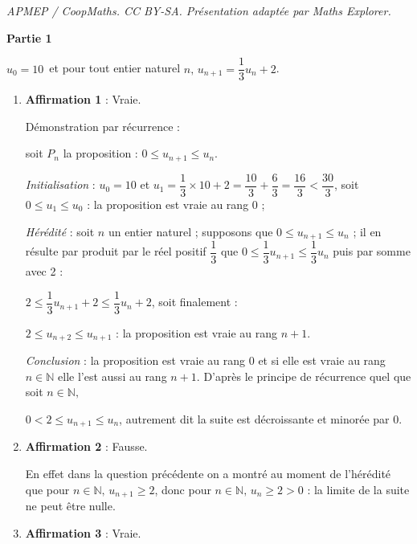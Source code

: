 \documentclass[10pt]{article}
\providecommand{\N}{\mathbb{N}}
\begin{document}
\noindent\textit{APMEP / CoopMaths. CC BY-SA. Présentation adaptée par Maths Explorer.}\par\medskip
\medskip









\textbf{Partie 1}

\medskip



\begin{center}$u_0 = 10$\, et pour tout entier naturel $n,\,u_{n+1} = \dfrac13 u_n + 2$.\end{center}

\medskip

\begin{enumerate}
\item \textbf{Affirmation 1} : Vraie. 

Démonstration par récurrence :

soit $P_n$ la proposition : \og $0 \leqslant u_{n+1} \leqslant u_n $\fg.

\emph{Initialisation} : $u_0 = 10$ et $u_1 = \dfrac13 \times 10 + 2 = \dfrac{10}{3} + \dfrac63 = \dfrac{16}{3} < \dfrac{30}{3}$, soit $0\leqslant u_1 \leqslant u_0$ : la proposition est vraie au rang $0$ ;

\emph{Hérédité} : soit $n$ un entier naturel ; supposons que  $0\leqslant u_{n+1} \leqslant u_n$ ; il en résulte par produit par le réel positif $\dfrac13$ que \quad  $0 \leqslant \dfrac13 u_{n+1} \leqslant \dfrac13 u_n$ puis par somme avec 2 :

$2 \leqslant \dfrac13 u_{n+1} + 2 \leqslant \dfrac13 u_n + 2$, soit finalement :

$2 \leqslant u_{n+2} \leqslant u_{n+1}$ : la proposition est vraie au rang $n + 1$.

\emph{Conclusion} : la proposition est vraie au rang 0 et si elle est vraie au rang $n \in \N$ elle l'est aussi au rang $n + 1$. D'après le principe de récurrence quel que soit $n \in \N,\,$

$ 0 < 2 \leqslant u_{n+1} \leqslant u_n$, autrement dit la suite est décroissante et minorée par $0$.

\item \textbf{Affirmation 2} : Fausse.

En effet dans la question précédente on a montré au moment de l'hérédité que pour $n \in \N, \, u_{n+1} \geqslant 2$, donc pour $n\in \N, \, u_n \geqslant 2 > 0$ : la limite de la suite ne peut être nulle.
\item \textbf{Affirmation 3} : Vraie.


\end{enumerate}
\end{document}
